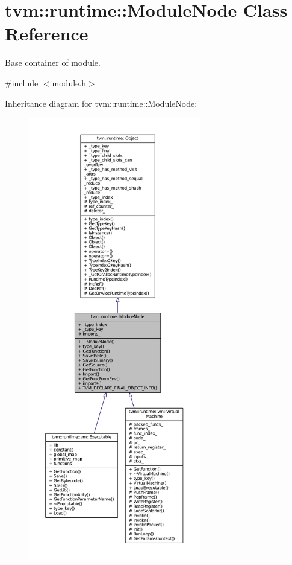\hypertarget{classtvm_1_1runtime_1_1ModuleNode}{}\section{tvm\+:\+:runtime\+:\+:Module\+Node Class Reference}
\label{classtvm_1_1runtime_1_1ModuleNode}


Base container of module.  




{\ttfamily \#include $<$module.\+h$>$}



Inheritance diagram for tvm\+:\+:runtime\+:\+:Module\+Node\+:
\nopagebreak
\begin{figure}[H]
\begin{center}
\leavevmode
\includegraphics[height=550pt]{classtvm_1_1runtime_1_1ModuleNode__inherit__graph}
\end{center}
\end{figure}


